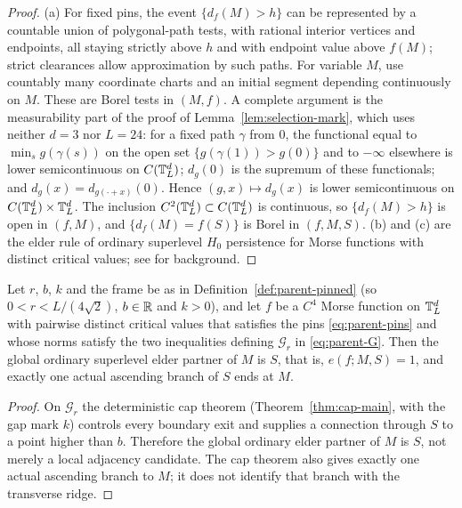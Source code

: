\begin{proof}
(a) For fixed pins, the event $\{d_f(M)>h\}$ can be represented by a countable union of polygonal-path tests, with rational interior vertices and endpoints, all staying strictly above $h$ and with endpoint value above $f(M)$; strict clearances allow approximation by such paths. For variable $M$, use countably many coordinate charts and an initial segment depending continuously on $M$. These are Borel tests in $(M,f)$. A complete argument is the measurability part of the proof of Lemma~\ref{lem:selection-mark}, which uses neither $d=3$ nor $L=24$: for a fixed path $\gamma$ from $0$, the functional equal to $\min_sg(\gamma(s))$ on the open set $\{g(\gamma(1))>g(0)\}$ and to $-\infty$ elsewhere is lower semicontinuous on $C(\mathbb T^d_L)$; $d_g(0)$ is the supremum of these functionals; and $d_g(x)=d_{g(\cdot+x)}(0)$. Hence $(g,x)\mapsto d_g(x)$ is lower semicontinuous on $C(\mathbb T^d_L)\times\mathbb T^d_L$. The inclusion $C^2(\mathbb T^d_L)\subset C(\mathbb T^d_L)$ is continuous, so $\{d_f(M)>h\}$ is open in $(f,M)$, and $\{d_f(M)=f(S)\}$ is Borel in $(f,M,S)$. (b) and (c) are the elder rule of ordinary superlevel $H_0$ persistence for Morse functions with distinct critical values; see \cite[\S3]{Curry} for background.
\end{proof}

\begin{lemma}\label{lem:parent-capimpl}
Let $r$, $b$, $k$ and the frame be as in Definition~\ref{def:parent-pinned} (so $0<r<L/(4\sqrt2)$, $b\in\mathbb R$ and $k>0$), and let $f$ be a $C^4$ Morse function on $\mathbb T^d_L$ with pairwise distinct critical values that satisfies the pins \eqref{eq:parent-pins} and whose norms satisfy the two inequalities defining $\mathcal G_r$ in \eqref{eq:parent-G}. Then the global ordinary superlevel elder partner of $M$ is $S$, that is, $e(f;M,S)=1$, and exactly one actual ascending branch of $S$ ends at $M$.
\end{lemma}

\begin{proof}
On $\mathcal G_r$ the deterministic cap theorem (Theorem~\ref{thm:cap-main}, with the gap mark $k$) controls every boundary exit and supplies a connection through $S$ to a point higher than $b$. Therefore the global ordinary elder partner of $M$ is $S$, not merely a local adjacency candidate. The cap theorem also gives exactly one actual ascending branch to $M$; it does not identify that branch with the transverse ridge.
\end{proof}

